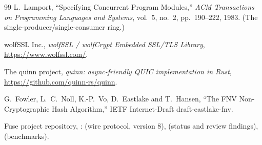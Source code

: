 \begin{thebibliography}{99}
 L.~Lamport, ``Specifying Concurrent Program Modules,'' \emph{ACM Transactions on Programming Languages and Systems}, vol.~5, no.~2, pp.~190--222, 1983. (The single-producer/single-consumer ring.)

 wolfSSL Inc., \emph{wolfSSL / wolfCrypt Embedded SSL/TLS Library}, \url{https://www.wolfssl.com/}.

 The quinn project, \emph{quinn: async-friendly QUIC implementation in Rust}, \url{https://github.com/quinn-rs/quinn}.

 G.~Fowler, L.~C.~Noll, K.-P.~Vo, D.~Eastlake and T.~Hansen, ``The FNV Non-Cryptographic Hash Algorithm,'' IETF Internet-Draft draft-eastlake-fnv.

 Fuse project repository, :  (wire protocol, version 8),  (status and review findings),  (benchmarks).

\end{thebibliography}
